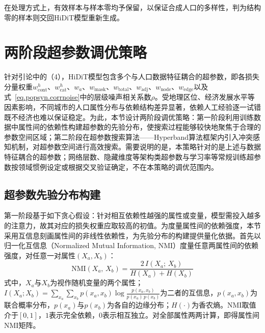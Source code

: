 在处理方式上，有效样本与样本零均予保留，以保证合成人口的多样性，判为结构零的样本则交回HiDiT模型重新生成。

\section{两阶段超参数调优策略}\label{sec.popsyn.tuning}
 
针对引论中的（4），HiDiT模型包含多个与人口数据特征耦合的超参数，即各损失分量权重$w_{\mathrm{cont}}^{h}$、$w_{\mathrm{cat}}^{h}$、$w_{a}$、$w_{\mathrm{mask}}$、$w_{\mathrm{total}}$、$w_{\mathrm{adj}}$、$w_{\mathrm{node}}$、$w_{\mathrm{edge}}$以及式~\eqref{eq.popsyn.corrnoise}中的层级噪声相关系数$\rho$。受地理区位、经济发展水平等因素影响，不同城市的人口属性分布与依赖结构差异显著，依赖人工经验逐一试错既不经济也难以保证稳定。为此，本节设计两阶段调优策略：第一阶段利用训练数据中属性间的依赖性构建超参数的先验分布，使搜索过程能够较快地聚焦于合理的参数空间区域；第二阶段在超参数搜索算法——Hyperband算法框架\cite{liHyperbandNovelBanditbased2018}内引入冲突感知机制，对超参数空间进行高效搜索。需要说明的是，本策略针对的是上述与数据特征耦合的超参数；网络层数、隐藏维度等架构类超参数与学习率等常规训练超参数按领域惯例设定或根据交叉验证确定，不在本策略的调优范围内。
 
\subsection{超参数先验分布构建}\label{subsec.popsyn.tuning.prior}
 
第一阶段基于如下贪心假设：针对相互依赖性越强的属性或变量，模型需投入越多的注意力，故其对应的损失权重应取较高的初值。为度量属性间的依赖强度，本节采用互信息刻画属性间的非线性依赖性，为先验分布的构建提供量化依据。首先以归一化互信息（Normalized Mutual Information, NMI）度量任意两属性间的依赖强度，对任意一对属性$(X_a, X_b)$：
\begin{equation}
  \mathrm{NMI}\left(X_a,\, X_b\right) = \frac{2\, I\left(X_a;\, X_b\right)}{H\left(X_a\right) + H\left(X_b\right)}
  \label{eq.popsyn.nmi}
\end{equation}
式中，$X_a$与$X_b$为视作随机变量的两个属性；$I(X_a; X_b) = \sum_{x_a} \sum_{x_b} p(x_a, x_b) \log \frac{p(x_a, x_b)}{p(x_a)\, p(x_b)}$为二者的互信息，$p(x_a, x_b)$为联合概率分布，$p(x_a)$与$p(x_b)$为各自的边缘分布；$H(\cdot)$为香农熵。NMI取值介于$[0, 1]$，$1$表示完全依赖，$0$表示相互独立。对全部属性两两计算，即得属性间NMI矩阵。
 
